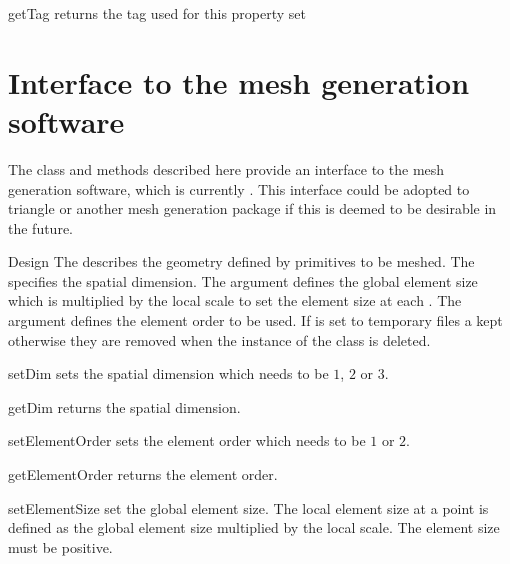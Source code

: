 \begin{methoddesc}[PropertySet]{getTag}{}
returns the tag used for this property set
\end{methoddesc}

\section{Interface to the mesh generation software}

The class and methods described here provide an interface to the mesh
generation software, which is currently \gmshextern.  This interface could be
adopted to triangle or another mesh generation package if this is
deemed to be desirable in the future.

\begin{classdesc}{Design}{
}
The  describes the geometry defined by primitives to be meshed.
The  specifies the spatial dimension. The argument  defines the global
element size which is multiplied by the local scale to set the element size at each \Point. 
The argument  defines the element order to be used. If  is set to 
\True temporary files a kept otherwise they are removed when the instance of the class is deleted. 
\end{classdesc}


\begin{methoddesc}[Design]{setDim}{}
sets the spatial dimension which needs to be $1$, $2$ or $3$.
\end{methoddesc}

\begin{methoddesc}[Design]{getDim}{}
returns the spatial dimension.
\end{methoddesc}

\begin{methoddesc}[Design]{setElementOrder}{}
sets the element order which needs to be $1$ or $2$.
\end{methoddesc}

\begin{methoddesc}[Design]{getElementOrder}{}
returns the element order.
\end{methoddesc}


\begin{methoddesc}[Design]{setElementSize}{}
set the global element size. The local element size at a point is defined as 
the global element size multiplied by the local scale. The element size must be positive.
\end{methoddesc}



